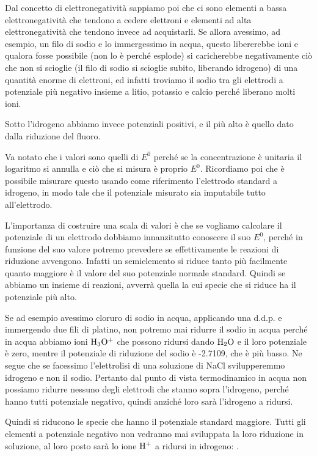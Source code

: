 Dal concetto di elettronegatività sappiamo poi che ci sono elementi a bassa elettronegatività che tendono a cedere elettroni e elementi ad alta elettronegatività che tendono invece ad acquistarli. Se allora avessimo, ad esempio, un filo di sodio e lo immergessimo in acqua, questo libererebbe ioni e qualora fosse possibile (non lo è perché esplode) si caricherebbe negativamente ciò che non si scioglie (il filo di sodio si scioglie subito, liberando idrogeno) di una quantità enorme di elettroni, ed infatti troviamo il sodio tra gli elettrodi a potenziale più negativo insieme a litio, potassio e calcio perché liberano molti ioni.

Sotto l'idrogeno abbiamo invece potenziali positivi, e il più alto è quello dato dalla riduzione del fluoro.

Va notato che i valori sono quelli di $E^0$ perché se la concentrazione è unitaria il logaritmo si annulla e ciò che si misura è proprio $E^0$. Ricordiamo poi che è possibile misurare questo usando come riferimento l'elettrodo standard a idrogeno, in modo tale che il potenziale misurato sia imputabile tutto all'elettrodo.

L'importanza di costruire una scala di valori è che se vogliamo calcolare il potenziale di un elettrodo dobbiamo innanzitutto conoscere il suo $E^0$, perché in funzione del suo valore potremo prevedere se effettivamente le reazioni di riduzione avvengono. Infatti un semielemento si riduce tanto più facilmente quanto maggiore è il valore del suo potenziale normale standard. Quindi se abbiamo un insieme di reazioni, avverrà quella la cui specie che si riduce ha il potenziale più alto.

Se ad esempio avessimo cloruro di sodio in acqua, applicando una d.d.p. e immergendo due fili di platino, non potremo mai ridurre il sodio in acqua perché in acqua abbiamo ioni $\rm H_3O^+$ che possono ridursi dando $\rm H_2O$ e il loro potenziale è zero, mentre il potenziale di riduzione del sodio è -2.7109, che è più basso. Ne segue che se facessimo l'elettrolisi di una soluzione di NaCl svilupperemmo idrogeno e non il sodio. Pertanto dal punto di vista termodinamico in acqua non possiamo ridurre nessuno degli elettrodi che stanno sopra l'idrogeno, perché hanno tutti potenziale negativo, quindi anziché loro sarà l'idrogeno a ridursi.

\vspace{0.2cm}Quindi si riducono le specie che hanno il potenziale standard maggiore. Tutti gli elementi a potenziale negativo non vedranno mai sviluppata la loro riduzione in soluzione, al loro posto sarà lo ione $\rm H^+$ a ridursi in idrogeno: .

